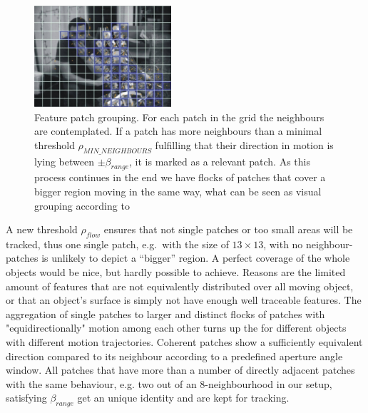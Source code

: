 \documentclass[conference]{IEEEtran}
\begin{document}
\begin{figure}
	\begin{center}
		\includegraphics[width=2in]{imgs/method/selection.pdf}
		\caption[Feature patch grouping. ]{Feature patch grouping. For each patch in the grid the neighbours are contemplated. If a patch has more neighbours than a minimal threshold $\rho_{MIN\_NEIGHBOURS}$ fulfilling that their direction in motion is lying between $\pm \beta_{range}$, it is marked as a relevant patch. As this process continues in the end we have flocks of patches that cover a bigger region moving in the same way, what can be seen as visual grouping according to \cite{ULGII23} }
		\label{fig:flocking}
	\end{center}
\end{figure}
%
A new threshold $\rho_{flow}$ ensures that not single patches or too small areas will be tracked, thus one single patch, e.g.\ with the size of $13 \times 13$, with no neighbour-patches is unlikely to depict a ``bigger'' region. A perfect coverage of the whole objects would be nice, but hardly possible to achieve. Reasons are the limited amount of features that are not equivalently distributed over all moving object, or that an object's surface is simply not have enough well traceable features. The aggregation of single patches to larger and distinct flocks of patches with "equidirectionally" motion among each other %
turns up the for different objects with different motion trajectories. Coherent patches show a sufficiently equivalent direction compared to its neighbour according to a predefined aperture angle window. All patches that have more than a number of directly adjacent patches with the same behaviour, e.g. two out of an 8-neighbourhood in our setup, satisfying  $\beta_{range}$ get an unique identity and are kept for tracking.
\end{document}
